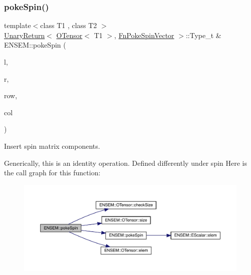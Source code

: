 \subsubsection{\texorpdfstring{pokeSpin()}{pokeSpin()}\hspace{0.1cm}{\footnotesize\ttfamily [2/2]}}
{\footnotesize\ttfamily template$<$class T1 , class T2 $>$ \\
\mbox{\hyperlink{structENSEM_1_1UnaryReturn}{Unary\+Return}}$<$ \mbox{\hyperlink{classENSEM_1_1OTensor}{O\+Tensor}}$<$ T1 $>$, \mbox{\hyperlink{structENSEM_1_1FnPokeSpinVector}{Fn\+Poke\+Spin\+Vector}} $>$\+::Type\+\_\+t \& E\+N\+S\+E\+M\+::poke\+Spin (\begin{DoxyParamCaption}\item[{\mbox{\hyperlink{classENSEM_1_1OTensor}{O\+Tensor}}$<$ T1 $>$ \&}]{l,  }\item[{const \mbox{\hyperlink{classENSEM_1_1OTensor}{O\+Tensor}}$<$ T2 $>$ \&}]{r,  }\item[{int}]{row,  }\item[{int}]{col }\end{DoxyParamCaption})\hspace{0.3cm}{\ttfamily [inline]}}



Insert spin matrix components. 

Generically, this is an identity operation. Defined differently under spin Here is the call graph for this function\+:\nopagebreak
\begin{figure}[H]
\begin{center}
\leavevmode
\includegraphics[width=350pt]{de/d87/group__obstensor_ga2d8623a3d55d368dba3e7b2e1418b6a1_cgraph}
\end{center}
\end{figure}
\mbox{\label{group__obstensor_ga94691b9c2a192ce60f55f93a4ccf1974}} 
